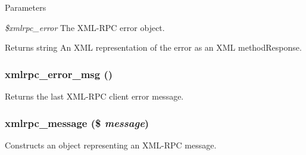 \begin{DoxyParams}{Parameters}
\item[{\em \$xmlrpc\_\-error}]The XML-\/RPC error object.\end{DoxyParams}
\begin{DoxyReturn}{Returns}
string An XML representation of the error as an XML methodResponse. 
\end{DoxyReturn}
\hypertarget{xmlrpc_8inc_abaf990108687e6e764164984306dbd55}{
\subsubsection[{xmlrpc\_\-error\_\-msg}]{\setlength{\rightskip}{0pt plus 5cm}xmlrpc\_\-error\_\-msg ()}}
\label{xmlrpc_8inc_abaf990108687e6e764164984306dbd55}
Returns the last XML-\/RPC client error message. \hypertarget{xmlrpc_8inc_a623f37020bfae3dec50facefc4cdcdac}{
\subsubsection[{xmlrpc\_\-message}]{\setlength{\rightskip}{0pt plus 5cm}xmlrpc\_\-message (\$ {\em message})}}
\label{xmlrpc_8inc_a623f37020bfae3dec50facefc4cdcdac}
Constructs an object representing an XML-\/RPC message.


